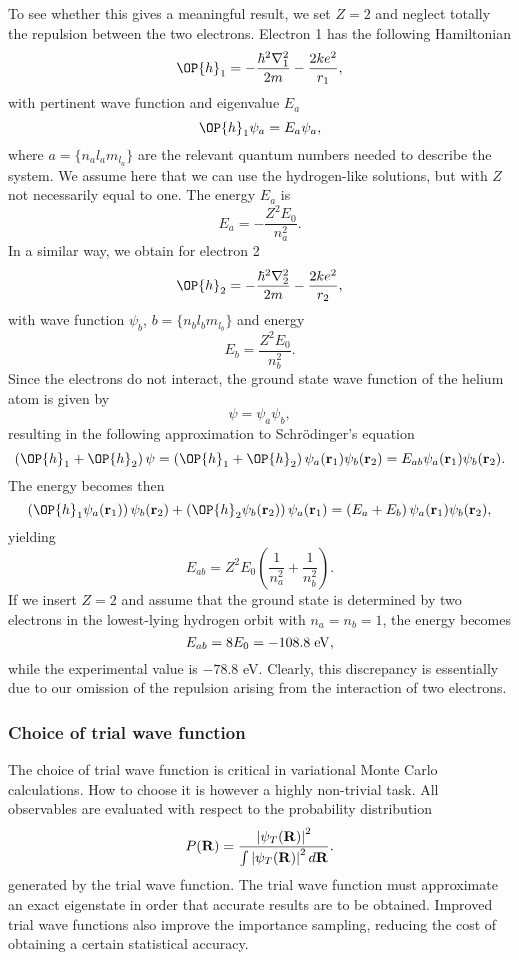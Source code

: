 To see whether this gives a meaningful result, we set 
$Z=2$ and neglect totally the repulsion between the two electrons.
Electron 1 has the following Hamiltonian
\[
   \OP{h}_1=-\frac{\hbar^2\nabla_1^2}{2m}
          -\frac{2ke^2}{r_1},
\]
with pertinent  wave function and eigenvalue $E_a$
\[
   \OP{h}_1\psi_a=E_a\psi_a,
\]
where $a=\{ n_al_am_{l_a}\}$ are the relevant  quantum numbers needed to describe the system.  We assume here that 
we can use the hydrogen-like solutions, but with $Z$ not necessarily equal to one.
The energy $E_a$ is
\[
   E_a=-\frac{Z^2E_0}{n_a^2}.
\]
In a similar way, we obtain for electron 2
\[
   \OP{h}_2=-\frac{\hbar^2\nabla_2^2}{2m}
          -\frac{2ke^2}{r_2},
\]
with wave function $\psi_b$, $b=\{ n_bl_bm_{l_b}\}$ and energy 
\[
   E_b=\frac{Z^2E_0}{n_b^2}.
\]
Since the electrons do not interact, the 
ground state wave function of the helium atom is given by
\[
  \psi=\psi_a\psi_b,
\]
resulting in the following approximation to Schr\"odinger's equation
\[
   \left(\OP{h}_1+\OP{h}_2\right)\psi=
    \left(\OP{h}_1+\OP{h}_2\right)
    \psi_a({\bf r}_1)\psi_b({\bf r}_2)=
    E_{ab}\psi_a({\bf r}_1)\psi_b({\bf r}_2).
\]
The energy becomes then
\[
    \left(\OP{h}_1\psi_a({\bf r}_1)\right)\psi_b({\bf r}_2) +
    \left(\OP{h}_2\psi_b({\bf r}_2)\right)\psi_a({\bf r}_1) =
    \left(E_{a}+E_b\right)\psi_a({\bf r}_1)\psi_b({\bf r}_2),
\]
yielding
\[
   E_{ab}=Z^2E_0\left(\frac{1}{n_a^2}+\frac{1}{n_b^2}\right).
\]
If we insert $Z=2$ and assume that the ground state is determined
by two electrons in the lowest-lying hydrogen orbit
with $n_a=n_b=1$, the energy becomes
\[
    E_{ab}=8E_0=-108.8\hspace{0.1cm} \mathrm{eV},
\]
while the experimental value is 
$-78.8$ eV. Clearly, this discrepancy is essentially due to
our omission of the repulsion arising from the interaction of
two electrons. 



\subsubsection{Choice of trial wave function}


The choice of trial wave function is critical in variational Monte Carlo calculations. 
How to choose it is however a highly non-trivial task. 
All observables are evaluated with respect to the probability distribution
\[
   P({\bf R})= \frac{\left|\psi_T({\bf R})\right|^2}{\int \left|\psi_T({\bf R})\right|^2d{\bf R}}.
\]
generated by the trial wave function.   
The trial wave function must approximate an exact 
eigenstate in order that accurate results are to be obtained. 
Improved trial
wave functions also improve the importance sampling, 
reducing the cost of obtaining a certain statistical accuracy. 

